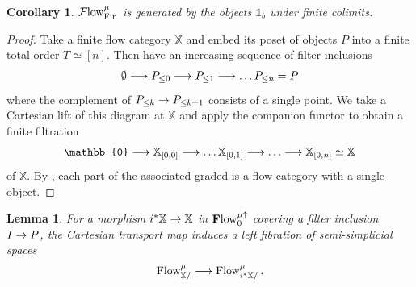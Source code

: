 \documentclass[10pt]{amsart}
\numberwithin{equation}{section}
\newtheorem{lem}[prop]{Lemma}
\newtheorem{cor}[prop]{Corollary}
\theoremstyle{definition}
\DeclareMathOperator{\Fin}{Fin}
\newcommand{\Flow}{\cF\mathrm{low}\vphantom{w}}
\newcommand{\PreFlow}{\mathrm{Flow}\vphantom{w}}
\newcommand{\bfPreFlow}{\mathbf{F}\mathrm{low}\vphantom{w}}
\newcommand{\bX}{\mathbb{X}}
\newcommand{\bOne}{\mathbb{1}}
\newcommand{\bZero}{\mathbb{0}}
\newcommand{\cF}{\mathcal{F}}
\renewcommand{\to}{\mathchoice{\longrightarrow}{\rightarrow}{}{}}
\begin{document}
\begin{cor}\label{cor:flow_fin_generation}
	$\Flow^{\mu}_{\Fin}$ is generated by the objects $\bOne_{b}$ under finite colimits.
\end{cor}

\begin{proof}
	Take a finite flow category $\bX$ and embed its poset of objects $P$ into a finite total order $T\simeq [n]$.
  Then have an increasing sequence of filter inclusions
	\begin{align*}
		\emptyset \to P_{\leq 0 } \to P_{\leq 1} \to \dots P_{\leq n} = P
	\end{align*}
	where the complement of $P_{\leq k} \to P_{\leq k+1}$ consists of a single point.
  We take a Cartesian lift of this diagram at $\bX$ and apply the companion functor to obtain a finite filtration
	\begin{align*}
		\bZero  \to \bX_{[0,0]} \to \dots \bX_{[0,1]} \to \dots \to \bX_{[0,n]} \simeq \bX
	\end{align*}
  of $\bX$.
	By , each part of the associated graded is a flow category with a single object.
\end{proof}

\begin{lem}\label{lem:restriction_is_fibration}
	For a morphism $i^{*}\bX \to \bX$ in $\bfPreFlow^{\mu\uparrow}_{0}$ covering a filter inclusion $I\to P$, the Cartesian transport map induces a left fibration of semi-simplicial spaces
	\begin{align*}
		\PreFlow^{\mu}_{\bX/} \to \PreFlow^{\mu}_{i^{*}\bX/} \,.
	\end{align*}
\end{lem}
\end{document}
